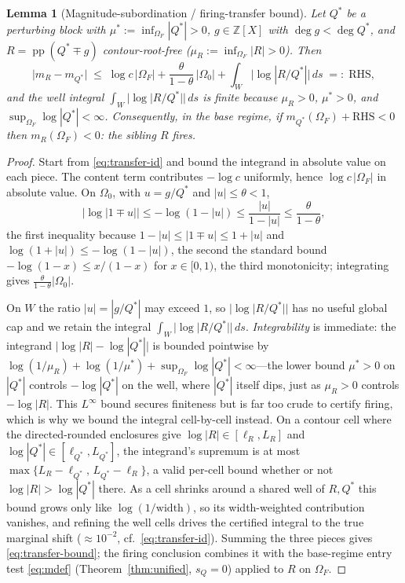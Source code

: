 \documentclass[11pt,reqno]{amsart}
\theoremstyle{plain}
\newtheorem{lemma}[theorem]{Lemma}
\theoremstyle{definition}
\theoremstyle{remark}
\newcommand{\Z}{\mathbb{Z}}
\DeclareMathOperator{\pp}{pp}
\begin{document}
\begin{lemma}[Magnitude-subordination / firing-transfer bound]\label{lem:transfer}
Let $Q^*$ be a perturbing block with $\mu^*:=\inf_{\Omega_F}|Q^*|>0$, $g\in\Z[X]$ with
$\deg g<\deg Q^*$, and $R=\pp(Q^*\mp g)$ contour-root-free
($\mu_R:=\inf_{\Omega_F}|R|>0$). Then
\begin{equation}\label{eq:transfer-bound}
  \bigl|m_R-m_{Q^*}\bigr|
  \;\le\;\log c\,|\Omega_F|
  +\frac{\theta}{1-\theta}\,|\Omega_0|
  +\int_{W}\bigl|\log|R/Q^*|\bigr|\,ds\;=:\;\mathrm{RHS},
\end{equation}
and the well integral $\int_{W}|\log|R/Q^*||\,ds$ is finite because $\mu_R>0$, $\mu^*>0$,
and $\sup_{\Omega_F}\log|Q^*|<\infty$. Consequently, in the base regime, if
$m_{Q^*}(\Omega_F)+\mathrm{RHS}<0$ then $m_R(\Omega_F)<0$: the sibling $R$ fires.
\end{lemma}

\begin{proof}
Start from \eqref{eq:transfer-id} and bound the integrand in absolute value on each
piece. The content term contributes $-\log c$ uniformly, hence $\log c\,|\Omega_F|$ in
absolute value. On $\Omega_0$, with $u=g/Q^*$ and $|u|\le\theta<1$,
\[
  \bigl|\log|1\mp u|\bigr|\le-\log(1-|u|)\le\frac{|u|}{1-|u|}\le\frac{\theta}{1-\theta},
\]
the first inequality because $1-|u|\le|1\mp u|\le 1+|u|$ and
$\log(1+|u|)\le-\log(1-|u|)$, the second the standard bound
$-\log(1-x)\le x/(1-x)$ for $x\in[0,1)$, the third monotonicity; integrating gives
$\frac{\theta}{1-\theta}|\Omega_0|$.

On $W$ the ratio $|u|=|g/Q^*|$ may exceed $1$, so $|\log|R/Q^*||$ has no useful global
cap and we retain the integral $\int_W|\log|R/Q^*||\,ds$. \emph{Integrability} is
immediate: the integrand $\bigl|\log|R|-\log|Q^*|\bigr|$ is bounded pointwise by
$\log(1/\mu_R)+\log(1/\mu^*)+\sup_{\Omega_F}\log|Q^*|<\infty$---the lower bound
$\mu^*>0$ on $|Q^*|$ controls $-\log|Q^*|$ on the well, where $|Q^*|$ itself dips, just
as $\mu_R>0$ controls $-\log|R|$. This $L^\infty$
bound secures finiteness but is far too crude to certify firing, which is why we bound
the integral cell-by-cell instead. On a contour cell where the directed-rounded
enclosures give $\log|R|\in[\ell_R,L_R]$ and $\log|Q^*|\in[\ell_{Q^*},L_{Q^*}]$, the
integrand's supremum is at most $\max\{L_R-\ell_{Q^*},\,L_{Q^*}-\ell_R\}$, a valid
per-cell bound whether or not $\log|R|>\log|Q^*|$ there. As a cell shrinks around a
shared well of $R,Q^*$ this bound grows only like $\log(1/\text{width})$, so its
width-weighted contribution vanishes, and refining the well cells drives the certified
integral to the true marginal shift ($\approx10^{-2}$, cf.\ \eqref{eq:transfer-id}).
Summing the three pieces gives \eqref{eq:transfer-bound}; the firing conclusion combines
it with the base-regime entry test \eqref{eq:mdef} (Theorem~\ref{thm:unified}, $s_Q=0$)
applied to $R$ on $\Omega_F$.
\end{proof}
\end{document}
